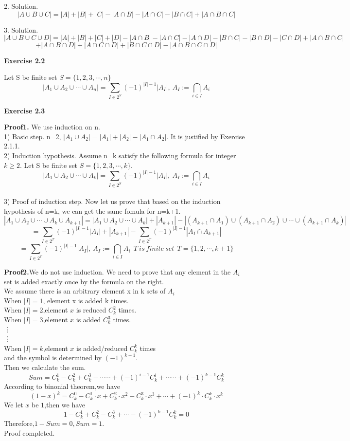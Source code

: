 \documentclass{article} %
\begin{document}
	2. Solution. $$|A\cup B\cup C|=|A|+|B|+|C|-|A\cap B|-|A\cap C|-|B\cap C|+|A\cap B\cap C|$$
	
	3. Solution. $$|A\cup B\cup C\cup D|=|A|+|B|+|C|+|D|-|A\cap B|-|A\cap C|-|A\cap D|-|B\cap C|-|B\cap D|-|C\cap D|+|A\cap B\cap C|$$ $$+|A\cap B\cap D|+|A\cap C\cap D|+|B\cap C\cap D|-|A\cap B\cap C\cap D|$$
	
	\textbf{Exercise 2.2}\par
	Let S be finite set $S=\{1,2,3,\cdots ,n\}$\\
	$$|A_1\cup A_2\cup \cdots \cup A_n|=\sum_{I\in 2^S}(-1)^{|I|-1}|A_I|,\ A_I:=\bigcap_{i\in I}A_i$$
	
	
	\textbf{Exercise 2.3}\par
	\textbf{Proof1.} We use induction on n.\\
	1) Basic step. n=2, $|A_1\cup A_2|=|A_1|+|A_2|-|A_1\cap A_2|$. It is justified by Exercise 2.1.1.\\
	2) Induction hypothesis. Assume n=k satisfy the following formula for integer $k\ge2$. Let S be finite set $S=\{1,2,3,\cdots ,k\}$. $$|A_1\cup A_2\cup \cdots \cup A_k|=\sum_{I\in 2^S}(-1)^{|I|-1}|A_I|,\ A_I:=\bigcap_{i\in I}A_i$$\\
	
	3) Proof of induction step. Now let us prove that based on the induction hypothesis of n=k, we can get the same fomula for n=k+1.
	$$|A_1\cup A_2\cup \cdots \cup A_k\cup A_{k+1}|=|A_1\cup A_2\cup \cdots \cup A_k|+|A_{k+1}|-|(A_{k+1}\cap A_1)\cup (A_{k+1}\cap A_2)\cup \cdots \cup(A_{k+1}\cap A_k)|$$
	$$=\sum_{I\in 2^T}(-1)^{|I|-1}|A_I|+|A_{k+1}|-\sum_{I\in 2^T}(-1)^{|I|-1}|A_I\cap A_{k+1}|$$
	$$=\sum_{I\in 2^T}(-1)^{|I|-1}|A_I|,\ A_I:=\bigcap_{i\in I}A_i\ \ T\ is\ finite\ set\ \ T=\{1,2,\cdots ,k+1\}$$
	
	\textbf{Proof2.}We do not use induction. We need to prove that any element in the $A_i$ set is added exactly once by the formula on the right.\\
	We assume there is an arbitrary element x in k sets of $A_i$\\
	When $|I|=1$, element x is added k times.\\
	When $| I | = 2$,element $x$ is reduced $C_k^2$ times.\\
	When $| I | = 3$,element $x$ is added $C_k^3$ times.\\
	\qquad\vdots\\
	\qquad\vdots\\
	When $| I | = k$,element $x$ is added/reduced $C_k^k$ times\\
	and the symbol is determined by $(-1)^{k-1}$.\\
	Then we calculate the sum.\\
	$$Sum = C_k^1 - C_k^2 + C_k^3 - \cdots\cdots + (-1)^{i-1}C_k^i + \cdots\cdots + (-1)^{k-1}C_k^k$$
	According to binonial theorem,we have\\
	$$(1-x)^k = C_k^0 - C_k^1 \cdot x + C_k^2 \cdot x^2 - C_k^3 \cdot x^3 + \cdots + (-1)^k \cdot C_k^k \cdot x^k$$
	We let $x$ be $1$,then we have\\
	$$1 - C_k^1 + C_k^2 - C_k^3 + \cdots -(-1)^{k-1}C_k^k = 0$$
	Therefore,$1 - Sum = 0,Sum = 1$.\\
	\qquad Proof completed.\\
	
\end{document}
